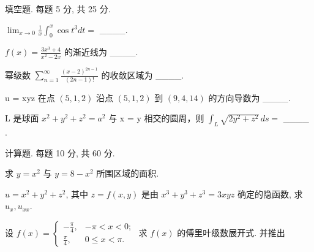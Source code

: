 \par{}
填空题. 每题 5 分, 共 25 分.\par
$\lim_{x\to0}\frac{1}{x}\int_{0}^{x}\cos t^{3}dt=$  \_\_\_\_.\par
$f(x)=\frac{3x^{3}+4}{x^{2}-2x}$  的渐近线为 \_\_\_\_.\par
幂级数  $\sum_{n=1}^{\infty}\frac{(x-2)^{2n-1}}{(2n-1)!}$  的收敛区域为 \_\_\_\_.\par
u = xyz 在点  $(5,1,2)$  沿点  $(5,1,2)$  到  $(9,4,14)$  的方向导数为 \_\_\_\_.\par
L 是球面  $x^{2} + y^{2} + z^{2} = a^{2}$  与 x = y 相交的圆周，则  $\int_{L} \sqrt{2y^{2} + z^{2}} \, ds =$ \_\_\_\_ .\par
\par{}
计算题. 每题 10 分, 共 60 分.\par
求 $y = x^{2}$ 与 $y = 8 - x^{2}$ 所围区域的面积.\par
$u = x^{2} + y^{2} + z^{2}$, 其中 $z = f(x, y)$ 是由 $x^{3} + y^{3} + z^{3} = 3xyz$ 确定的隐函数, 求 $u_{x}, u_{xx}$.\par
\par{}
设 $f(x) = \begin{cases} -\frac{\pi}{4}, & -\pi < x < 0; \\ \frac{\pi}{4}, & 0 \leq x < \pi. \end{cases}$ 求 $f(x)$ 的傅里叶级数展开式. 并推出\par
\nopagebreak[4]
